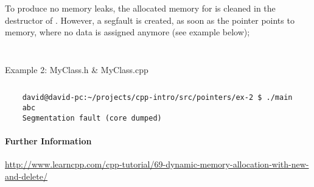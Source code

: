 	To produce no memory leaks, the allocated memory for  is cleaned in the destructor of . However, a segfault is created, as soon as the pointer points to memory, where no data is assigned anymore (see example below);
	
	\begin{listing}[!htbp]
		\begin{minipage}[t]{0.45\textwidth}
			\inputminted{cpp}{src/pointers/ex-2/MyClass.h}
		\end{minipage}\hfill
		\begin{minipage}[t]{0.45\textwidth}
			\inputminted{cpp}{src/pointers/ex-2/MyClass.cpp}
		\end{minipage}
		\caption{Example 2: MyClass.h \& MyClass.cpp}
	\end{listing}

	\inputminted{cpp}{src/pointers/ex-2/main.cpp}
	
	\begin{verbatim}
	david@david-pc:~/projects/cpp-intro/src/pointers/ex-2 $ ./main 
	abc
	Segmentation fault (core dumped)
	\end{verbatim}
	
	\paragraph{Further Information}
	
	\url{http://www.learncpp.com/cpp-tutorial/69-dynamic-memory-allocation-with-new-and-delete/}